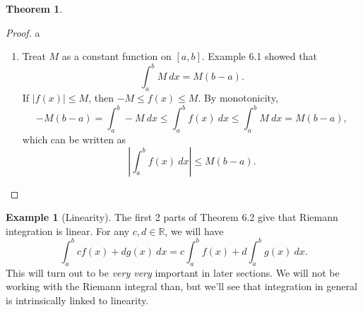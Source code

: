 \documentclass{article}
\newcommand{\R}{\mathbb{R}}
\theoremstyle{definition}
\newtheorem{theorem}{Theorem}[section]
\newtheorem{example}{Example}[section]
\begin{document}
\begin{theorem}
\begin{proof}{\color{white}a}
\begin{enumerate}
				\begin{align*}
					U(P^*,f)=U(Q,f)+U(R,f),\\
					L(P^*,f)=L(Q,f)+L(R,f).
				\end{align*}
				We can conclude \begin{align*}
					U(Q,f)-L(Q,f)=U(P^*,f)-L(P^*,f)-[U(R,f)-L(R,f)]\le U(P,f)-L(P,f)<\varepsilon,\\
					U(R,f)-L(R,f)=U(P^*,f)-L(P^*,f)-[U(Q,f)-L(Q,f)]\le U(P,f)-L(P,f)<\varepsilon.
				\end{align*}
				This shows that $ f $ is integrable on $ [a,c] $ and $ [c,b] $ by Riemann's Criterion.
				
				We have 
				\begin{align*}
					\int_{a}^{b}f(x)\ dx\le U(P,f)=U(Q,f)+U(R,f)< L(Q,f)+L(R,f)+\varepsilon< \int_{a}^{c}f(x)\ dx+\int_{c}^{b}f(x)\ dx+\varepsilon,\\
					\int_{a}^{b}f(x)\ dx\ge U(P,f)=U(Q,f)+U(R,f)> U(Q,f)+U(R,f)-\varepsilon> \int_{a}^{c}f(x)\ dx+\int_{c}^{b}f(x)\ dx-\varepsilon,
				\end{align*}
				which combine to give
				$$ \int_{a}^{c}f(x)\ dx+\int_{c}^{b}f(x)\ dx-\varepsilon<\int_{a}^{b}f(x)\ dx< \int_{a}^{c}f(x)\ dx+\int_{c}^{b}f(x)\ dx+\varepsilon.$$ If this for all $ \varepsilon>0 $, then $$\int_{a}^{b}f(x)\ dx=\int_{a}^{c}f(x)\ dx+\int_{c}^{b}f(x)\ dx $$
				\item Treat $ M $ as a constant function on $ [a,b] $. Example 6.1 showed that $$\int_{a}^{b}M\ dx=M(b-a). $$ If $ |f(x)|\le M $, then $ -M\le f(x)\le M $. By monotonicity, $$-M(b-a)=\int_{a}^{b}-M\ dx\le \int_{a}^{b}f(x)\ dx\le \int_{a}^{b}M\ dx=M(b-a), $$ which can be written as $$ \left\lvert\int_{a}^{b}f(x)\ dx \right\rvert\le M(b-a) .$$
			\end{enumerate}
			
		\end{proof}
	\end{theorem}
	\begin{example}[Linearity]
		The first 2 parts of Theorem 6.2 give that Riemann integration is linear. For any $ c,d\in\R $, we will have $$\int_{a}^{b}cf(x)+dg(x)\ dx=c\int_{a}^{b}f(x)+d\int_{a}^{b}g(x)\ dx .$$ This will turn out to be \textit{very very} important in later sections. We will not be working with the Riemann integral than, but we'll see that integration in general is intrinsically linked to linearity. 
	\end{example}
	
\end{document}
